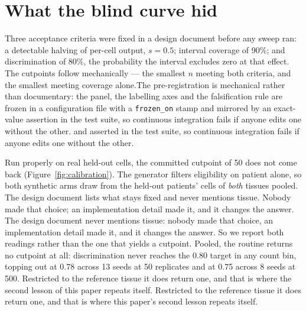\section{What the blind curve hid}
\label{sec:calibration}

Three acceptance criteria were fixed in a design document before any sweep ran:
a detectable halving of per-cell output, $s = 0.5$; interval coverage of 90\%;
and discrimination of 80\%, the probability the interval excludes zero at that
effect.\iffull{} The cutpoints follow mechanically --- the smallest $n$ meeting
both criteria, and the smallest meeting coverage alone.\fi The pre-registration is
mechanical rather than documentary: the panel, the labelling axes and the
falsification rule are frozen in a configuration file
\iffull
with a \texttt{frozen\_on} stamp and mirrored by an exact-value assertion in the
test suite, so continuous integration fails if anyone edits one without the
other.
\else
and asserted in the test suite, so continuous integration fails if anyone edits
one without the other.
\fi

Run properly on real held-out cells, the committed cutpoint of 50 does not come
back\iffull{} (Figure~\ref{fig:calibration})\fi. The generator filters eligibility on
patient alone, so both synthetic arms draw from the held-out patients' cells of
\emph{both} tissues pooled.
\iffull
The design document lists what stays fixed and never
mentions tissue. Nobody made that choice; an implementation detail made it, and
it changes the answer.
\else
The design document never mentions tissue: nobody made
that choice, an implementation detail made it, and it changes the answer.
\fi
So we report both readings rather than the one that
yields a cutpoint. Pooled, the routine returns no cutpoint at all: discrimination
never reaches the 0.80 target in any count bin, topping out at 0.78 across 13
seeds at 50 replicates and at 0.75 across 8 seeds at 500.\iffull{} Restricted to
the reference tissue it does return one, and that is where the second lesson of
this paper repeats itself.\else{} Restricted to the reference tissue it does
return one, and that is where this paper's second lesson repeats itself.\fi

